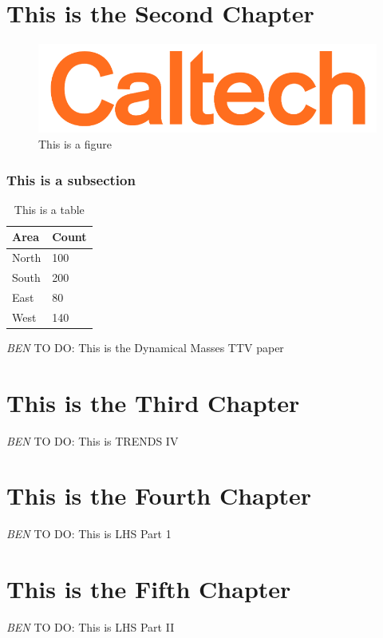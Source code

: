 \documentclass[12pt]{caltech_thesis}
\newcommand{\todo}[3]{{\color{#2} \emph{#1} TO DO: #3}}
\newcommand{\btmtodo}[1]{\todo{BEN}{red}{#1}}
\begin{document}
\chapter{This is the Second Chapter}
\label{chap:ttvs}

\begin{figure}[hbt!]
\centering
\includegraphics[width=.3\textwidth]{caltech.png}
\caption[Example Figure]{This is a figure}
\label{fig:logo}
\end{figure}

\subsection{This is a subsection}

\begin{table}[hbt!]
\centering
\begin{tabular}{ll}
\hline
Area & Count\\
\hline
North & 100\\
South & 200\\
East & 80\\
West & 140\\
\hline
\end{tabular}
\caption[Table]{This is a table}
\label{tab:sample}
\end{table}



\btmtodo{This is the Dynamical Masses TTV paper}


\chapter{This is the Third Chapter}
\label{chap:trends}


\btmtodo{This is TRENDS IV}

\chapter{This is the Fourth Chapter}
\label{chap:lhs1}

\btmtodo{This is LHS Part 1}
\chapter{This is the Fifth Chapter}

\btmtodo{This is LHS Part II}
\label{chap:lhsspitz}
\end{document}
